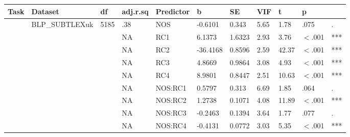 \begin{table}[ht]
\centering
\begingroup\normalsize
\begin{tabular}{lllllllllll}
  \hline
Task & Dataset & df & adj.r.sq & Predictor & b & SE & VIF & t & p &  \\ 
  \hline
 & BLP\_SUBTLEXuk & 5185 & .38 & NOS & -0.6101 & 0.343 & 5.65 & 1.78 & .075 & . \\ 
   &  &  & NA & RC1 & 6.1373 & 1.6323 & 2.93 & 3.76 & $<$.001 & *** \\ 
   &  &  & NA & RC2 & -36.4168 & 0.8596 & 2.59 & 42.37 & $<$.001 & *** \\ 
   &  &  & NA & RC3 & 4.8669 & 0.9864 & 3.08 & 4.93 & $<$.001 & *** \\ 
   &  &  & NA & RC4 & 8.9801 & 0.8447 & 2.51 & 10.63 & $<$.001 & *** \\ 
   &  &  & NA & NOS:RC1 & 0.5797 & 0.313 & 6.69 & 1.85 & .064 & . \\ 
   &  &  & NA & NOS:RC2 & 1.2738 & 0.1071 & 4.08 & 11.89 & $<$.001 & *** \\ 
   &  &  & NA & NOS:RC3 & -0.2463 & 0.1394 & 3.64 & 1.77 & .077 & . \\ 
   &  &  & NA & NOS:RC4 & -0.4131 & 0.0772 & 3.03 & 5.35 & $<$.001 & *** \\ 
   \hline
\end{tabular}
\endgroup
\end{table}
